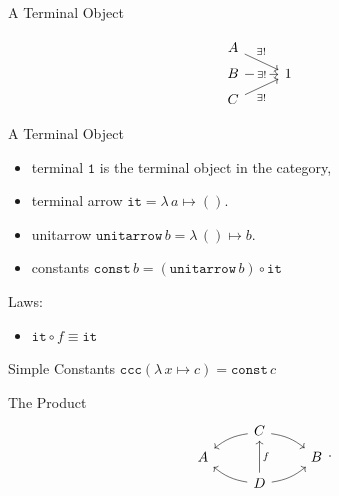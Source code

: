 \documentclass[10pt]{beamer}
\newcommand{\termin}{\mathtt{1}}
\newcommand{\termarr}{\mathtt{it}}
\newcommand{\unitarrow}{\ensuremath{\mathtt{unitarrow}}}
\newcommand{\lamf}[2]{\ensuremath{\lambda\, #1 \mapsto #2}}
\newcommand{\ccc}{\ensuremath{\mathtt{ccc}}}
\newcommand{\lamtoccc}[1]{\ensuremath{\ccc (#1)}}
\newcommand{\const}{\ensuremath{\mathtt{const}}}
\theoremstyle{definition}
\theoremstyle{remark}
\numberwithin{equation}{section}
\begin{document}
\begin{frame}[fragile]{A Terminal Object}
  \begin{center}
    \[
    \begin{tikzcd}[row sep=tiny]
      A \arrow[near start]{dr}{\exists!} & \\
      B \arrow["\exists!" description]{r} & 1\\
      C \arrow[swap,near start]{ur}{\exists!} & 
    \end{tikzcd}
    \]
  \end{center}
\end{frame}

\begin{frame}[fragile]{A Terminal Object}
  \begin{itemize}
  \item terminal $\termin$ is the terminal object in the category,
  \item terminal arrow $\termarr = \lamf{a}{()}$.
  \item unitarrow $\unitarrow\, b = \lamf{()}{b}$.
  \item constants $\const\, b = (\unitarrow\, b) \circ \termarr$
  \end{itemize}
  
  Laws:\\
  \begin{itemize}
  \item $\termarr \circ f \equiv \termarr$
  \end{itemize}
\end{frame}

\begin{frame}[fragile]{Simple Constants}
  $\lamtoccc{\lamf{x}{c}} = \const\, c$
\end{frame}

\begin{frame}[fragile]{The Product}
  \[
    \begin{tikzcd}[row sep=tiny]
       & C \arrow[bend right=15]{dl} \arrow[bend left=15]{dr} & \\
      A & & B \\
       & D \arrow[bend left=15]{ul} \arrow[swap]{uu}{f} \arrow[bend right=15]{ur} & 
    \end{tikzcd}\rlap{.}
  \]
\end{frame}
\end{document}
